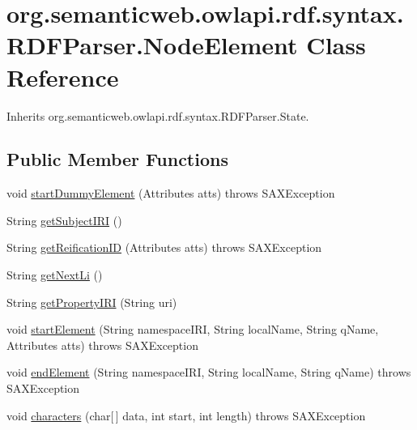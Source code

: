 \hypertarget{classorg_1_1semanticweb_1_1owlapi_1_1rdf_1_1syntax_1_1_r_d_f_parser_1_1_node_element}{\section{org.\-semanticweb.\-owlapi.\-rdf.\-syntax.\-R\-D\-F\-Parser.\-Node\-Element Class Reference}
\label{classorg_1_1semanticweb_1_1owlapi_1_1rdf_1_1syntax_1_1_r_d_f_parser_1_1_node_element}
}


Inherits org.\-semanticweb.\-owlapi.\-rdf.\-syntax.\-R\-D\-F\-Parser.\-State.

\subsection*{Public Member Functions}
\begin{DoxyCompactItemize}
\item 
void \hyperlink{classorg_1_1semanticweb_1_1owlapi_1_1rdf_1_1syntax_1_1_r_d_f_parser_1_1_node_element_aedfd5262c335ac7849fbb06c8bd30455}{start\-Dummy\-Element} (Attributes atts)  throws S\-A\-X\-Exception 
\item 
String \hyperlink{classorg_1_1semanticweb_1_1owlapi_1_1rdf_1_1syntax_1_1_r_d_f_parser_1_1_node_element_a5e61dcb77b4b95d091b5732d6c93bbc1}{get\-Subject\-I\-R\-I} ()
\item 
String \hyperlink{classorg_1_1semanticweb_1_1owlapi_1_1rdf_1_1syntax_1_1_r_d_f_parser_1_1_node_element_a3fac260b6e92ef73c87e4dd1fd3f7cfa}{get\-Reification\-I\-D} (Attributes atts)  throws S\-A\-X\-Exception 
\item 
String \hyperlink{classorg_1_1semanticweb_1_1owlapi_1_1rdf_1_1syntax_1_1_r_d_f_parser_1_1_node_element_a02a6bfb5050ca8c8c6934c86bdc638e0}{get\-Next\-Li} ()
\item 
String \hyperlink{classorg_1_1semanticweb_1_1owlapi_1_1rdf_1_1syntax_1_1_r_d_f_parser_1_1_node_element_ab8f876b935c99c21aa2b3a1d7b3a7f65}{get\-Property\-I\-R\-I} (String uri)
\item 
void \hyperlink{classorg_1_1semanticweb_1_1owlapi_1_1rdf_1_1syntax_1_1_r_d_f_parser_1_1_node_element_a0c095bb85decb6f0e435974631f9e781}{start\-Element} (String namespace\-I\-R\-I, String local\-Name, String q\-Name, Attributes atts)  throws S\-A\-X\-Exception 
\item 
void \hyperlink{classorg_1_1semanticweb_1_1owlapi_1_1rdf_1_1syntax_1_1_r_d_f_parser_1_1_node_element_a9b76cb6008d03d78aa640b79266056f7}{end\-Element} (String namespace\-I\-R\-I, String local\-Name, String q\-Name)  throws S\-A\-X\-Exception 
\item 
void \hyperlink{classorg_1_1semanticweb_1_1owlapi_1_1rdf_1_1syntax_1_1_r_d_f_parser_1_1_node_element_aa48cd2c006fd7fa298c55d0521deba7e}{characters} (char\mbox{[}$\,$\mbox{]} data, int start, int length)  throws S\-A\-X\-Exception 
\end{DoxyCompactItemize}
